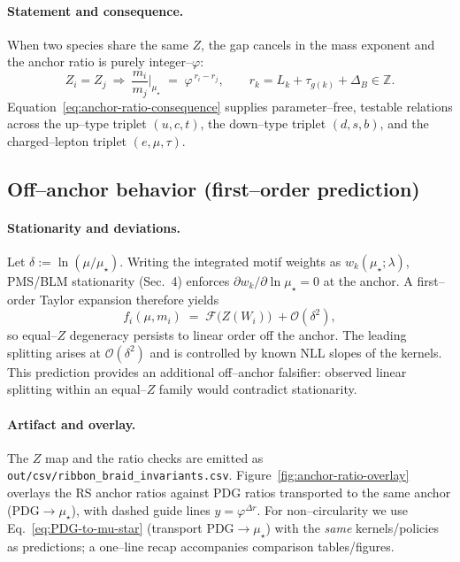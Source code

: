 \documentclass[epjc3]{svjour3}
\begin{document}
\paragraph{Statement and consequence.}
When two species share the same $Z$, the gap cancels in the mass exponent and the anchor ratio is purely integer--$\varphi$:
\begin{equation}
  Z_i=Z_j
  \ \Longrightarrow\
  \frac{m_i}{m_j}\Big|_{\mu_\star}
  \;=\;
  \varphi^{\,r_i-r_j},
  \qquad
  r_k=L_k+\tau_{g(k)}+\Delta_B\in\mathbb{Z}.
  \label{eq:anchor-ratio-consequence}
\end{equation}
Equation~\eqref{eq:anchor-ratio-consequence} supplies parameter--free, testable relations across the up--type triplet $(u,c,t)$, the down--type triplet $(d,s,b)$, and the charged--lepton triplet $(e,\mu,\tau)$.

\subsection{Off--anchor behavior (first--order prediction)}
\paragraph{Stationarity and deviations.}
Let $\delta:=\ln(\mu/\mu_\star)$. Writing the integrated motif weights as $w_k(\mu_\star;\lambda)$, PMS/BLM stationarity (Sec.~4) enforces $\partial w_k/\partial\ln\mu_\star=0$ at the anchor. A first--order Taylor expansion therefore yields
\[
  f_i(\mu,m_i)\;=\;\mathcal F\bigl(Z(W_i)\bigr)\;+
  \mathcal O(\delta^2),
\]
so equal--$Z$ degeneracy persists to linear order off the anchor. The leading splitting arises at $\mathcal O(\delta^2)$ and is controlled by known NLL slopes of the kernels. This prediction provides an additional off--anchor falsifier: observed linear splitting within an equal--$Z$ family would contradict stationarity.

\paragraph{Artifact and overlay.}
The $Z$ map and the ratio checks are emitted as \texttt{out/csv/ribbon\_braid\_invariants.csv}.  Figure~\ref{fig:anchor-ratio-overlay} overlays the RS anchor ratios against PDG ratios transported to the same anchor (PDG$\to\mu_\star$), with dashed guide lines $y=\varphi^{\Delta r}$.
For non--circularity we use Eq.~\eqref{eq:PDG-to-mu-star} (transport PDG$\to\mu_\star$) with the \emph{same} kernels/policies as predictions; a one--line recap accompanies comparison tables/figures.
\end{document}
